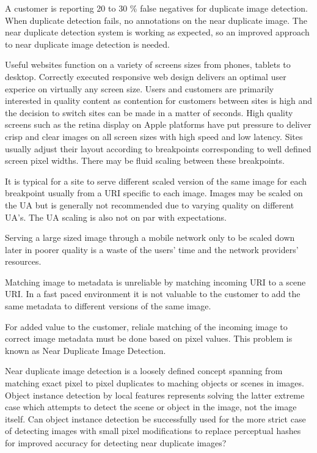 \documentclass[english,12pt,a4paper,pdftex,elec,utf8]{aaltothesis}
\begin{document}
A customer is reporting 20 to 30 \% false negatives for duplicate image detection. When duplicate detection fails,  no annotations on the near duplicate image. The near duplicate detection system is working as expected, so an improved approach to near duplicate image detection is needed.

Useful websites function on a variety of screens sizes from phones, tablets to desktop. Correctly executed responsive web design delivers an optimal user experice on virtually any screen size. Users and customers are primarily interested in quality content as contention for customers between sites is high and the decision to switch sites can be made in a matter of seconds. High quality screens such as the retina display on Apple platforms have put pressure to deliver crisp and clear images on all screen sizes with high speed and low latency. Sites usually adjust their layout according to breakpoints corresponding to well defined screen pixel widths. There may be fluid scaling between these breakpoints.

It is typical for a site to serve different scaled version of the same image for each breakpoint usually from a URI specific to each image. Images may be scaled on the UA but is generally not recommended due to varying quality on different UA's. The UA scaling is also not on par with expectations.

Serving a large sized image through a mobile network only to be scaled down later in poorer quality is a waste of the users' time and the network providers' resources.

Matching image to metadata is unreliable by matching incoming URI to a scene URI. In a fast paced environment it is not valuable to the customer to add the same metadata to different versions of the same image.

For added value to the customer, reliale matching of the incoming image to correct image metadata must be done based on pixel values. This problem is known as Near Duplicate Image Detection.

Near duplicate image detection is a loosely defined concept spanning from matching exact pixel to pixel duplicates to maching objects or scenes in images. Object instance detection by local features represents solving the latter extreme case which attempts to detect the scene or object in the image, not the image itself. Can object instance detection be successfully used for the more strict case of detecting images with small pixel modifications to replace perceptual hashes for improved accuracy for detecting near duplicate images?
\end{document}
